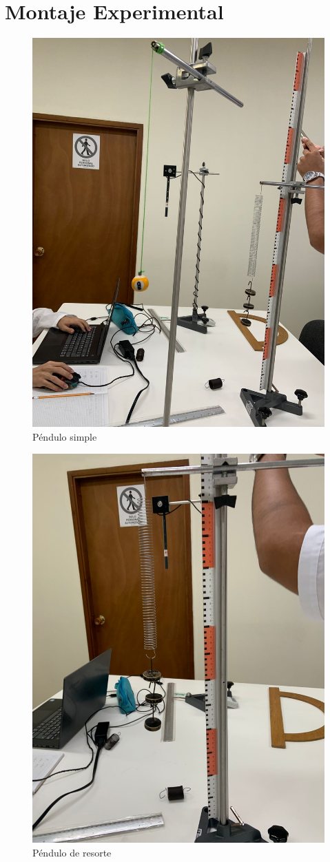 \documentclass[twocolumn, 12pt]{article}
\begin{document}
\nocite{tipos-pendulos-2}

\section{Montaje Experimental}

\begin{figure}[H]
    \begin{center}
        \includegraphics[width=0.6\linewidth]{./Images/IMAGEN_1.jpeg}
    \end{center}
    \caption{Péndulo simple}
\end{figure}

\begin{figure}[H]
    \begin{center}
        \includegraphics[width=0.6\linewidth]{./Images/IMAGEN_2.jpeg}
    \end{center}
    \caption{Péndulo de resorte}
\end{figure}
\end{document}
